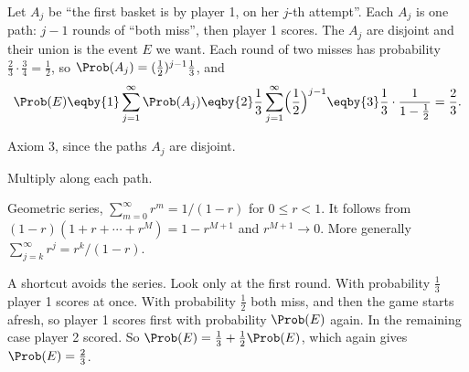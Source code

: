 \begin{center}
\end{center}
Let $A_j$ be ``the first basket is by player 1, on her $j$-th attempt''. Each
$A_j$ is one path: $j-1$ rounds of ``both miss'', then player 1 scores. The
$A_j$ are disjoint and their union is the event $E$ we want. Each round of
two misses has probability $\tfrac23\cdot\tfrac34=\tfrac12$, so
$\Prob(A_j)=(\tfrac12)^{j-1}\tfrac13$, and
\begin{align*}
\Prob(E)\eqby{1}\sum_{j=1}^\infty\Prob(A_j)
\eqby{2}\frac13\sum_{j=1}^\infty\Bigl(\frac12\Bigr)^{j-1}
\eqby{3}\frac13\cdot\frac{1}{1-\tfrac12}=\frac23 .
\end{align*}
\begin{explain}
  \item Axiom 3, since the paths $A_j$ are disjoint.
  \item Multiply along each path.
  \item Geometric series, $\sum_{m=0}^\infty r^m=1/(1-r)$ for $0\le r<1$. It follows
        from $(1-r)(1+r+\cdots+r^{M})=1-r^{M+1}$ and $r^{M+1}\to0$. More generally
        $\sum_{j=k}^\infty r^j=r^k/(1-r)$.
\end{explain}
A shortcut avoids the series. Look only at the first round. With probability
$\tfrac13$ player 1 scores at once. With probability $\tfrac12$ both miss, and then
the game starts afresh, so player 1 scores first with probability $\Prob(E)$
again. In the remaining case player 2 scored. So
$\Prob(E)=\tfrac13+\tfrac12\Prob(E)$, which again gives $\Prob(E)=\tfrac23$.


